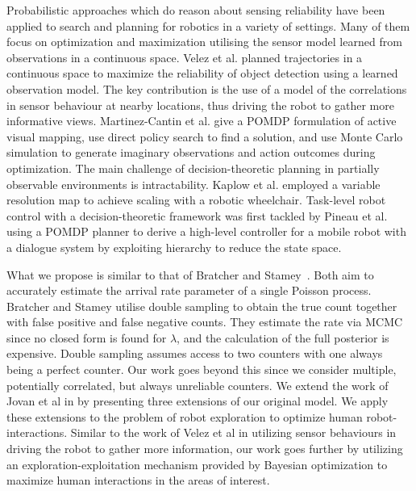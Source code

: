 Probabilistic approaches which do reason about sensing reliability have been applied to search and planning for robotics in a variety of settings. Many of them focus on optimization and maximization utilising the sensor model learned from observations in a continuous space. Velez et al. \cite{velez2012modelling} planned trajectories in a continuous space to maximize the reliability of object detection using a learned observation model. The key contribution is the use of a model of the correlations in sensor behaviour at nearby locations, thus driving the robot to gather more informative views. Martinez-Cantin et al. \cite{martinez2009bayesian} give a POMDP formulation of active visual mapping, use direct policy search to find a solution, and use Monte Carlo simulation to generate imaginary observations and action outcomes during optimization. The main challenge of decision-theoretic planning in partially observable environments is intractability. Kaplow et al. \cite{kaplow2010variable} employed a variable resolution map to achieve scaling with a robotic wheelchair. Task-level robot control with a decision-theoretic framework was first tackled by Pineau et al. \cite{pineau2003towards} using a POMDP planner to derive a high-level controller for a mobile robot with a dialogue system by exploiting hierarchy to reduce the state space.

What we propose is similar to that of Bratcher and Stamey~\cite{bratcher2002}. Both aim to accurately estimate the arrival rate parameter of a single Poisson process. Bratcher and Stamey utilise double sampling to obtain the true count together with false positive and false negative counts. They estimate the rate via MCMC since no closed form is found for $\lambda$, and the calculation of the full posterior is expensive. Double sampling assumes access to two counters with one always being a perfect counter. Our work goes beyond this since we consider multiple, potentially correlated, but always unreliable counters. We extend the work of Jovan et al in \cite{jovan18a} by presenting three extensions of our original model. We apply these extensions to the problem of robot exploration to optimize human robot-interactions. Similar to the work of Velez et al \cite{velez2012modelling} in utilizing sensor behaviours in driving the robot to gather more information, our work goes further by utilizing an exploration-exploitation mechanism provided by Bayesian optimization to maximize human interactions in the areas of interest.

